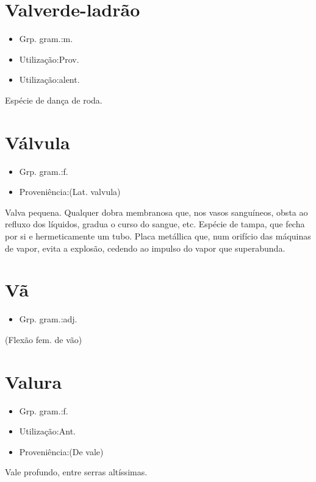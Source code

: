 \documentclass{article}
\begin{document}
\section{Valverde-ladrão}
\begin{itemize}
\item {Grp. gram.:m.}
\end{itemize}
\begin{itemize}
\item {Utilização:Prov.}
\end{itemize}
\begin{itemize}
\item {Utilização:alent.}
\end{itemize}
Espécie de dança de roda.
\section{Válvula}
\begin{itemize}
\item {Grp. gram.:f.}
\end{itemize}
\begin{itemize}
\item {Proveniência:(Lat. \textunderscore valvula\textunderscore )}
\end{itemize}
Valva pequena.
Qualquer dobra membranosa que, nos vasos sanguíneos, obsta ao refluxo dos líquidos, gradua o curso do sangue, etc.
Espécie de tampa, que fecha por si e hermeticamente um tubo.
Placa metállica que, num orifício das máquinas de vapor, evita a explosão, cedendo ao impulso do vapor que superabunda.
\section{Vã}
\begin{itemize}
\item {Grp. gram.:adj.}
\end{itemize}
(Flexão fem. de \textunderscore vão\textunderscore )
\section{Valura}
\begin{itemize}
\item {Grp. gram.:f.}
\end{itemize}
\begin{itemize}
\item {Utilização:Ant.}
\end{itemize}
\begin{itemize}
\item {Proveniência:(De \textunderscore vale\textunderscore )}
\end{itemize}
Vale profundo, entre serras altíssimas.
\end{document}
